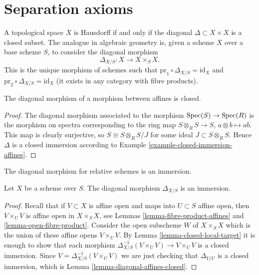 \section{Separation axioms}
\label{section-separation-axioms}

\noindent
A topological space $X$ is Hausdorff if and only if the
diagonal $\Delta \subset X \times X$ is a closed subset.
The analogue in algebraic geometry is, given a scheme $X$ over
a base scheme $S$, to consider the
diagonal morphism
$$
\Delta_{X/S} : X \longrightarrow X \times_S X.
$$
This is the unique morphism of schemes such that
$\text{pr}_1 \circ \Delta_{X/S} = \text{id}_X$ and
$\text{pr}_2 \circ \Delta_{X/S} = \text{id}_X$ (it exists in
any category with fibre products).

\begin{lemma}
\label{lemma-diagonal-affines-closed}
The diagonal morphism of a morphism between affines is closed.
\end{lemma}

\begin{proof}
The diagonal morphism associated to the morphism
$\mathop{\mathrm{Spec}}(S) \to \mathop{\mathrm{Spec}}(R)$ is the morphism on spectra
corresponding to the ring
map $S \otimes_R S \to S$, $a \otimes b \mapsto ab$.
This map is clearly surjective, so $S \cong S \otimes_R S/J$
for some ideal $J \subset S \otimes_R S$. Hence
$\Delta$ is a closed immersion according to
Example \ref{example-closed-immersion-affines}.
\end{proof}

\begin{lemma}
\label{lemma-diagonal-immersion}
\begin{slogan}
The diagonal morphism for relative schemes is an immersion.
\end{slogan}
Let $X$ be a scheme over $S$.
The diagonal morphism $\Delta_{X/S}$ is an immersion.
\end{lemma}

\begin{proof}
Recall that if $V \subset X$ is affine open and maps into
$U \subset S$ affine open, then $V \times_U V$ is affine open
in $X \times_S X$, see Lemmas \ref{lemma-fibre-product-affines}
and \ref{lemma-open-fibre-product}.
Consider the open subscheme $W$ of $X \times_S X$ which
is the union of these affine opens $V \times_U V$.
By Lemma \ref{lemma-closed-local-target} it is enough
to show that each morphism
$\Delta_{X/S}^{-1}(V \times_U V) \to V \times_U V$ is
a closed immersion. Since $V = \Delta_{X/S}^{-1}(V \times_U V)$
we are just checking that $\Delta_{V/U}$ is a closed
immersion, which is Lemma \ref{lemma-diagonal-affines-closed}.
\end{proof}

